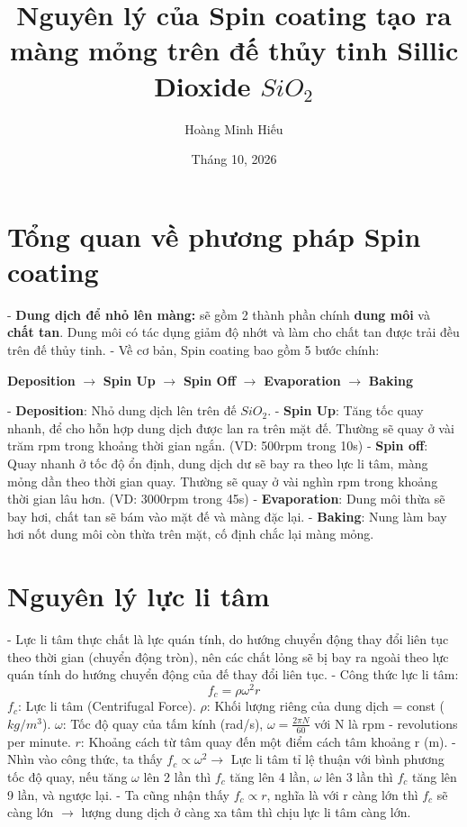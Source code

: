 \documentclass{article}
\title{Nguyên lý của Spin coating tạo ra màng mỏng trên đế thủy tinh Sillic Dioxide $SiO_2$}
\author{Hoàng Minh Hiếu}
\date{Tháng 10, 2026}
\begin{document}
\maketitle

\section{Tổng quan về phương pháp Spin coating}
- \textbf{Dung dịch để nhỏ lên màng:} sẽ gồm 2 thành phần chính \textbf{dung môi} và \textbf{chất tan}. Dung môi có tác dụng giảm độ nhớt và làm cho chất tan được trải đều trên đế thủy tinh. \newline
- Về cơ bản, Spin coating bao gồm 5 bước chính: 
\begin{center}
    \textbf{Deposition} $\longrightarrow$ \textbf{Spin Up} $\longrightarrow$ \textbf{Spin Off} $\longrightarrow$ \textbf{Evaporation} $\longrightarrow$ \textbf{Baking}
\end{center}
- \textbf{Deposition}: Nhỏ dung dịch lên trên đế $SiO_2$. \newline
- \textbf{Spin Up}: Tăng tốc quay nhanh, để cho hỗn hợp dung dịch được lan ra trên mặt đế. Thường sẽ quay ở vài trăm rpm trong khoảng thời gian ngắn. (VD: 500rpm trong 10s) \newline
- \textbf{Spin off}: Quay nhanh ở tốc độ ổn định, dung dịch dư sẽ bay ra theo lực li tâm, màng mỏng dần theo thời gian quay. Thường sẽ quay ở vài nghìn rpm trong khoảng thời gian lâu hơn. (VD: 3000rpm trong 45s) \newline
- \textbf{Evaporation}: Dung môi thừa sẽ bay hơi, chất tan sẽ bám vào mặt đế và màng đặc lại. \newline
- \textbf{Baking}: Nung làm bay hơi nốt dung môi còn thừa trên mặt, cố định chắc lại màng mỏng.

\section{Nguyên lý lực li tâm}
- Lực li tâm thực chất là lực quán tính, do hướng chuyển động thay đổi liên tục theo thời gian (chuyển động tròn), nên các chất lỏng sẽ bị bay ra ngoài theo lực quán tính do hướng chuyển động của đế thay đổi liên tục. \newline
- Công thức lực li tâm: 
\[f_c = \rho \omega^2 r\]
$f_c$: Lực li tâm (Centrifugal Force).\newline
$\rho$: Khối lượng riêng của dung dịch = const ($kg/m^3$). \newline
$\omega$: Tốc độ quay của tấm kính (rad/s), $\omega = \frac{2\pi N}{60}$ với N là rpm - revolutions per minute.\newline
$r$: Khoảng cách từ tâm quay đến một điểm cách tâm khoảng r (m). \newline
- Nhìn vào công thức, ta thấy $f_c \propto \omega^2 \longrightarrow$ Lực li tâm tỉ lệ thuận với bình phương tốc độ quay, nếu tăng $\omega$ lên 2 lần thì $f_c$ tăng lên 4 lần, $\omega$ lên 3 lần thì $f_c$ tăng lên 9 lần, và ngược lại. \newline
- Ta cũng nhận thấy $f_c \propto r$, nghĩa là với r càng lớn thì $f_c$ sẽ càng lớn $\longrightarrow$ lượng dung dịch ở càng xa tâm thì chịu lực li tâm càng lớn. 
\end{document}
